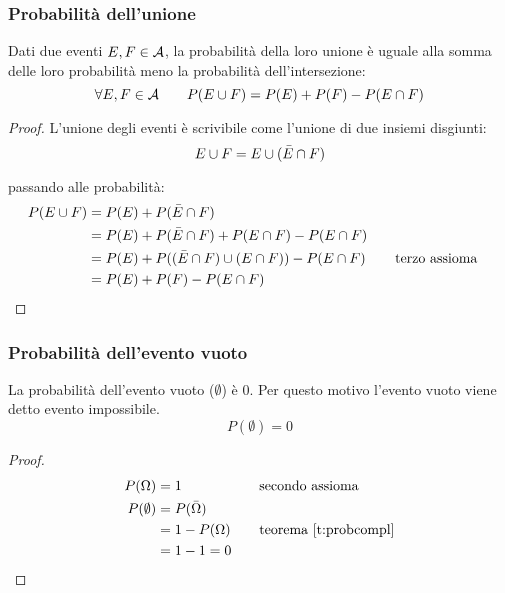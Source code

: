 \subsubsection{Probabilità dell'unione}
\begin{teor} \label{t:probunion}
	Dati due eventi $E,F\in\mathcal A$, la probabilità della loro unione è uguale alla somma delle loro probabilità meno la probabilità dell'intersezione:
	\begin{equation*}
		\forall E,F \in\mathcal A\qquad P(E\cup F)=P(E)+P(F)-P(E\cap F)
	\end{equation*}
\end{teor}
\begin{proof}
	L'unione degli eventi è scrivibile come l'unione di due insiemi disgiunti:
	\begin{equation*}
		E\cup F=E \cup (\bar E\cap F) \\[1ex]
	\end{equation*}

	passando alle probabilità:
	\begin{alignat*}{2}
		P(E\cup F) & = P(E)+P(\bar E\cap F)                                              \\
		           & = P(E)+P(\bar E\cap F)+P(E\cap F)-P(E\cap F)                        \\
		           & = P(E)+P((\bar E\cap F)\cup (E\cap F))-P(E\cap F)	& \quad & \text{terzo assioma} \\
		           & = P(E)+P(F)-P(E\cap F)
	\end{alignat*}
\end{proof}

\subsubsection{Probabilità dell'evento vuoto}
La probabilità dell'evento vuoto ($\emptyset$) è $0$. Per questo motivo l'evento vuoto viene detto evento impossibile.
\begin{equation*}
	P(\emptyset)=0
\end{equation*}

\begin{proof}
	\begin{align*}
		P(\Omega)    & = 1 & \quad & \text{secondo assioma}                      \\
		P(\emptyset) & = P(\bar\Omega)                               \\
		             & = 1 - P(\Omega)& \quad & \text{teorema \ref{t:probcompl}} \\
		             & = 1 - 1 = 0
	\end{align*}
\end{proof}



